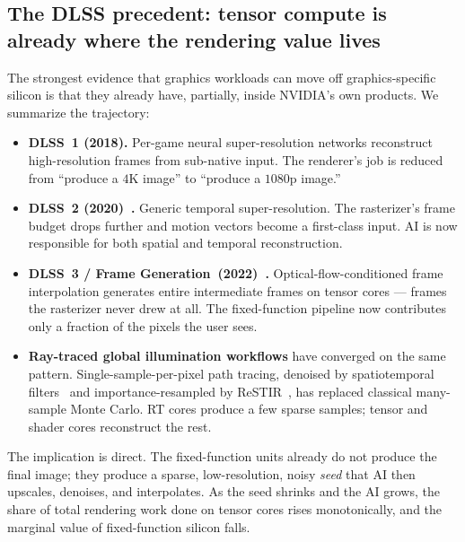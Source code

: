 \documentclass[10pt,journal]{IEEEtran}
\begin{document}
\subsection{The DLSS precedent: tensor compute is already where the
rendering value lives}\label{sec:dlss}

The strongest evidence that graphics workloads can move off
graphics-specific silicon is that they already have, partially, inside
NVIDIA's own products. We summarize the trajectory:

\begin{itemize}
    \item \textbf{DLSS~1 (2018).} Per-game neural super-resolution
    networks reconstruct high-resolution frames from sub-native input.
    The renderer's job is reduced from ``produce a $4\textrm{K}$
    image'' to ``produce a $1080\textrm{p}$ image.''

    \item \textbf{DLSS~2 (2020)~\cite{liu2020nsrr,edelsten2019dlss}.}
    Generic temporal super-resolution. The rasterizer's frame budget
    drops further and motion vectors become a first-class input. AI is
    now responsible for both spatial and temporal reconstruction.

    \item \textbf{DLSS~3 / Frame
    Generation~(2022)~\cite{nvidia-dlss3}.} Optical-flow-conditioned
    frame interpolation generates entire intermediate frames on tensor
    cores --- frames the rasterizer never drew at all. The
    fixed-function pipeline now contributes only a fraction of the
    pixels the user sees.

    \item \textbf{Ray-traced global illumination workflows} have
    converged on the same pattern. Single-sample-per-pixel path
    tracing, denoised by spatiotemporal
    filters~\cite{schied2017svgf,chaitanya2017interactive,nvidia-nrd}
    and importance-resampled by ReSTIR~\cite{bitterli2020restir}, has
    replaced classical many-sample Monte Carlo. RT cores produce a few
    sparse samples; tensor and shader cores reconstruct the rest.
\end{itemize}

The implication is direct. The fixed-function units already do not
produce the final image; they produce a sparse, low-resolution, noisy
\emph{seed} that AI then upscales, denoises, and interpolates. As the
seed shrinks and the AI grows, the share of total rendering work done
on tensor cores rises monotonically, and the marginal value of
fixed-function silicon falls.
\end{document}
